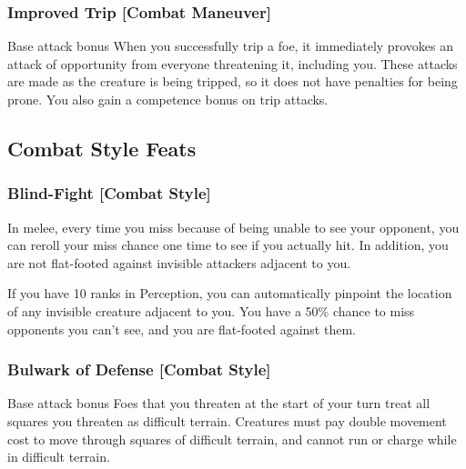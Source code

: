 \begin{comment}
\subsubsection{Improved Sunder [Combat Maneuver]}
\parhead{Prerequisites} Base attack bonus \plus4
\parhead{Benefit} When you strike at an object held or carried by an opponent (such as a weapon or shield), you ignore half the hardness of the sundered item. You also gain a \plus2 competence bonus on sunder attacks.
\end{comment}

\subsubsection{Improved Trip [Combat Maneuver]}
 Base attack bonus 
 When you successfully trip a foe, it immediately provokes an attack of opportunity from everyone threatening it, including you. These attacks are made as the creature is being tripped, so it does not have penalties for being prone. You also gain a  competence bonus on trip attacks.

\subsection{Combat Style Feats}

\subsubsection{Blind-Fight [Combat Style]}
 In melee, every time you miss because of being unable to see your opponent, you can reroll your miss chance one time to see if you actually hit. In addition, you are not flat-footed against invisible attackers adjacent to you.
\par If you have 10 ranks in Perception, you can automatically pinpoint the location of any invisible creature adjacent to you. 
 You have a 50\% chance to miss opponents you can't see, and you are flat-footed against them.

\subsubsection{Bulwark of Defense [Combat Style]}
 Base attack bonus 
 Foes that you threaten at the start of your turn treat all squares you threaten as difficult terrain. Creatures must pay double movement cost to move through squares of difficult terrain, and cannot run or charge while in difficult terrain.

